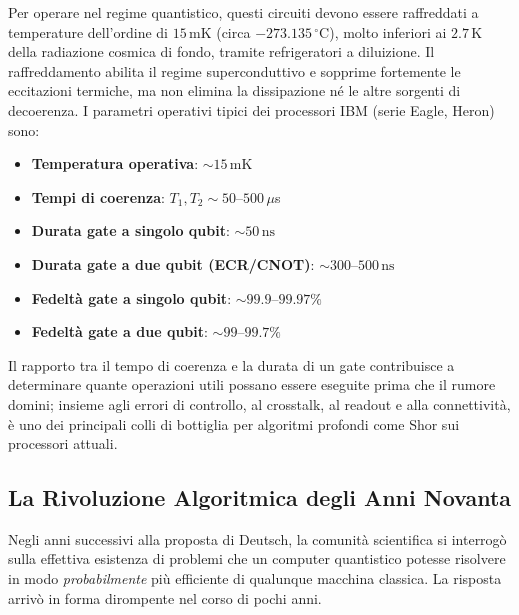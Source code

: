 \begin{onehalfspace}
Per operare nel regime quantistico, questi circuiti devono essere raffreddati a temperature dell'ordine di $15\,\text{mK}$ (circa $-273.135\,^{\circ}\text{C}$), molto inferiori ai $2.7\,\text{K}$ della radiazione cosmica di fondo, tramite refrigeratori a diluizione. Il raffreddamento abilita il regime superconduttivo e sopprime fortemente le eccitazioni termiche, ma non elimina la dissipazione né le altre sorgenti di decoerenza.
\clearpage
I parametri operativi tipici dei processori IBM (serie Eagle, Heron) sono:

\begin{itemize}
    \item \textbf{Temperatura operativa}: $\sim 15\,\text{mK}$
    \item \textbf{Tempi di coerenza}: $T_1, T_2 \sim 50$--$500\,\mu$s
    \item \textbf{Durata gate a singolo qubit}: $\sim 50\,\text{ns}$
    \item \textbf{Durata gate a due qubit (ECR/CNOT)}: $\sim 300$--$500\,\text{ns}$
    \item \textbf{Fedeltà gate a singolo qubit}: $\sim 99.9$--$99.97\%$
    \item \textbf{Fedeltà gate a due qubit}: $\sim 99$--$99.7\%$
\end{itemize}

Il rapporto tra il tempo di coerenza e la durata di un gate contribuisce a determinare quante operazioni utili possano essere eseguite prima che il rumore domini; insieme agli errori di controllo, al crosstalk, al readout e alla connettività, è uno dei principali colli di bottiglia per algoritmi profondi come Shor sui processori attuali.

\subsection{La Rivoluzione Algoritmica degli Anni Novanta}
\label{app:intro:algoritmi}

Negli anni successivi alla proposta di Deutsch, la comunità scientifica si interrogò sulla effettiva esistenza di problemi che un computer quantistico potesse risolvere in modo \textit{probabilmente} più efficiente di qualunque macchina classica. La risposta arrivò in forma dirompente nel corso di pochi anni.


\end{onehalfspace}
